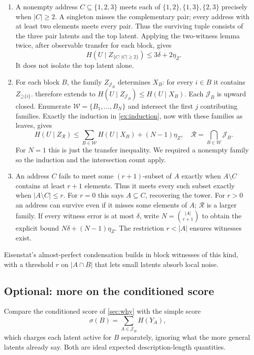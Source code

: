 \documentclass[11pt]{article}
\newcommand{\Up}{\mathord{\supseteq}}
\begin{document}
\begin{solution}[ex:blocks]
\begin{enumerate}
\item A nonempty address $C\subseteq\{1,2,3\}$ meets each of
$\{1,2\},\{1,3\},\{2,3\}$ precisely when $|C|\ge2$.
A singleton misses the complementary pair; every address with at least two
elements meets every pair. Thus the surviving tuple consists of the three
pair latents and the top latent. Applying the two-witness lemma twice, after
observable transfer for each block, gives
\[
 H(U\mid Z_{\{C:|C|\ge2\}})\le3\delta+2\eta_Z.
\]
It does not isolate the top latent alone.
\item For each block $B$, the family $Z_{\mathcal{J}_B}$ determines
$X_B$: for every $i\in B$ it contains $Z_{\Up\{i\}}$.  therefore
extends to $H(U\mid Z_{\mathcal{J}_B})\le H(U\mid X_B)$.
Each $\mathcal{J}_B$ is upward closed. Enumerate
$\mathcal{W}=\{B_1,\ldots,B_N\}$ and intersect the first $j$ contributing
families. Exactly the induction in \cref{ex:induction}, now with these families as leaves,
gives
\[
 H(U\mid Z_{\mathcal{R}})\le
 \sum_{B\in\mathcal{W}}H(U\mid X_B)+(N-1)\eta_Z,
 \quad \mathcal{R}=\bigcap_{B\in\mathcal{W}}\mathcal{J}_B.
\]
For $N=1$ this is just the transfer inequality. We required a nonempty family
so the induction and the intersection count apply.
\item An address $C$ fails to meet some $(r+1)$-subset of $A$ exactly when
$A\setminus C$ contains at least $r+1$ elements. Thus it meets every such
subset exactly when $|A\setminus C|\le r$. For $r=0$ this says
$A\subseteq C$, recovering the tower. For $r>0$ an address can survive even
if it misses some elements of $A$; $\mathcal{R}$ is a larger family.
If every witness error is at most $\delta$, write
$N=\binom{|A|}{r+1}$ to obtain the explicit bound
$N\delta+(N-1)\eta_Z$. The restriction $r<|A|$ ensures witnesses exist.
\end{enumerate}
\end{solution}

Eisenstat's almost-perfect condensation \citep{eisenstat2025condensation}
builds in block witnesses of this kind, with a threshold $r$ on $|A\cap B|$
that lets small latents absorb local noise.

\subsection{Optional: more on the conditioned score}
\label{sec:scores}
Compare the conditioned score of \cref{sec:why} with the simple score
\[
 \sigma(B)=\sum_{A\in\mathcal{J}_B}H(Y_A),
\]
which charges each latent active for $B$ separately, ignoring what the more
general latents already say. Both are ideal expected description-length
quantities.
\end{document}
